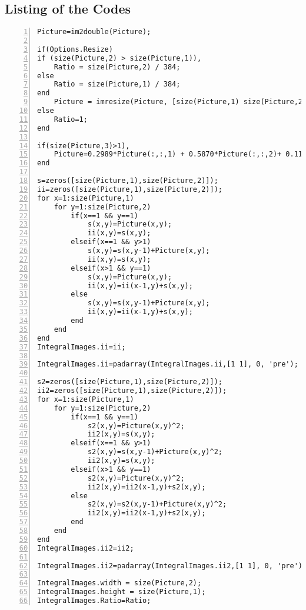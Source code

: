 \newpage
\subsection{Listing of the Codes}

\begin{lstlisting}[style=Matlab-editor, numbers=left, label={lst:GetIntergralImages},captionpos=b, caption={Code \textbf{GetIntergralImages.m} }]
Picture=im2double(Picture);

if(Options.Resize)
if (size(Picture,2) > size(Picture,1)),
	Ratio = size(Picture,2) / 384;
else
	Ratio = size(Picture,1) / 384;
end
	Picture = imresize(Picture, [size(Picture,1) size(Picture,2) ]/ Ratio);
else
	Ratio=1;
end

if(size(Picture,3)>1),
	Picture=0.2989*Picture(:,:,1) + 0.5870*Picture(:,:,2)+ 0.1140*Picture(:,:,3);
end

s=zeros([size(Picture,1),size(Picture,2)]);
ii=zeros([size(Picture,1),size(Picture,2)]);
for x=1:size(Picture,1)
	for y=1:size(Picture,2)
		if(x==1 && y==1)
			s(x,y)=Picture(x,y);
			ii(x,y)=s(x,y);
		elseif(x==1 && y>1)
			s(x,y)=s(x,y-1)+Picture(x,y);
			ii(x,y)=s(x,y);
		elseif(x>1 && y==1)
			s(x,y)=Picture(x,y);
			ii(x,y)=ii(x-1,y)+s(x,y);
		else
			s(x,y)=s(x,y-1)+Picture(x,y);
			ii(x,y)=ii(x-1,y)+s(x,y);
		end
	end
end
IntegralImages.ii=ii;

IntegralImages.ii=padarray(IntegralImages.ii,[1 1], 0, 'pre');

s2=zeros([size(Picture,1),size(Picture,2)]);
ii2=zeros([size(Picture,1),size(Picture,2)]);
for x=1:size(Picture,1)
	for y=1:size(Picture,2)
		if(x==1 && y==1)
			s2(x,y)=Picture(x,y)^2;
			ii2(x,y)=s(x,y);
		elseif(x==1 && y>1)
			s2(x,y)=s(x,y-1)+Picture(x,y)^2;
			ii2(x,y)=s(x,y);
		elseif(x>1 && y==1)
			s2(x,y)=Picture(x,y)^2;
			ii2(x,y)=ii2(x-1,y)+s2(x,y);
		else
			s2(x,y)=s2(x,y-1)+Picture(x,y)^2;
			ii2(x,y)=ii2(x-1,y)+s2(x,y);
		end
	end
end
IntegralImages.ii2=ii2;

IntegralImages.ii2=padarray(IntegralImages.ii2,[1 1], 0, 'pre');

IntegralImages.width = size(Picture,2);
IntegralImages.height = size(Picture,1);
IntegralImages.Ratio=Ratio;
\end{lstlisting}

